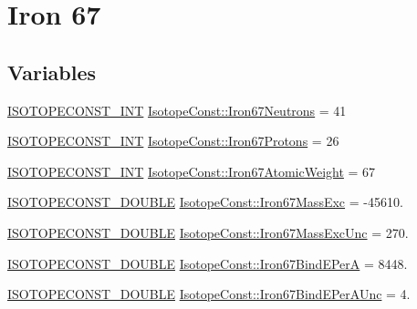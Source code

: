 \hypertarget{group___isotope_const-_iron-_fe67}{}\section{Iron 67}
\label{group___isotope_const-_iron-_fe67}
\subsection*{Variables}
\begin{DoxyCompactItemize}
\item 
\mbox{\hyperlink{group___isotope_const-_macros_ga5f18360b3e99483a35c32d789e62621c}{I\+S\+O\+T\+O\+P\+E\+C\+O\+N\+S\+T\+\_\+\+I\+NT}} \mbox{\hyperlink{group___isotope_const-_iron-_fe67_ga4c54272213845cc0ddd581d516defbfa}{Isotope\+Const\+::\+Iron67\+Neutrons}} = 41
\item 
\mbox{\hyperlink{group___isotope_const-_macros_ga5f18360b3e99483a35c32d789e62621c}{I\+S\+O\+T\+O\+P\+E\+C\+O\+N\+S\+T\+\_\+\+I\+NT}} \mbox{\hyperlink{group___isotope_const-_iron-_fe67_gaa5210e3b7420a4ed967f057b2b70e247}{Isotope\+Const\+::\+Iron67\+Protons}} = 26
\item 
\mbox{\hyperlink{group___isotope_const-_macros_ga5f18360b3e99483a35c32d789e62621c}{I\+S\+O\+T\+O\+P\+E\+C\+O\+N\+S\+T\+\_\+\+I\+NT}} \mbox{\hyperlink{group___isotope_const-_iron-_fe67_ga9f5e283e902f31cb39ec4d963811831b}{Isotope\+Const\+::\+Iron67\+Atomic\+Weight}} = 67
\item 
\mbox{\hyperlink{group___isotope_const-_macros_ga8f45a7272ce02c0b4c65c44636ed719a}{I\+S\+O\+T\+O\+P\+E\+C\+O\+N\+S\+T\+\_\+\+D\+O\+U\+B\+LE}} \mbox{\hyperlink{group___isotope_const-_iron-_fe67_ga3c478fc3050d270956f394af8ac315f3}{Isotope\+Const\+::\+Iron67\+Mass\+Exc}} = -\/45610.
\item 
\mbox{\hyperlink{group___isotope_const-_macros_ga8f45a7272ce02c0b4c65c44636ed719a}{I\+S\+O\+T\+O\+P\+E\+C\+O\+N\+S\+T\+\_\+\+D\+O\+U\+B\+LE}} \mbox{\hyperlink{group___isotope_const-_iron-_fe67_gaa00466830f0d4c23033dff5176c28757}{Isotope\+Const\+::\+Iron67\+Mass\+Exc\+Unc}} = 270.
\item 
\mbox{\hyperlink{group___isotope_const-_macros_ga8f45a7272ce02c0b4c65c44636ed719a}{I\+S\+O\+T\+O\+P\+E\+C\+O\+N\+S\+T\+\_\+\+D\+O\+U\+B\+LE}} \mbox{\hyperlink{group___isotope_const-_iron-_fe67_gac4a3b41edec666ba0edec29f855a9517}{Isotope\+Const\+::\+Iron67\+Bind\+E\+PerA}} = 8448.
\item 
\mbox{\hyperlink{group___isotope_const-_macros_ga8f45a7272ce02c0b4c65c44636ed719a}{I\+S\+O\+T\+O\+P\+E\+C\+O\+N\+S\+T\+\_\+\+D\+O\+U\+B\+LE}} \mbox{\hyperlink{group___isotope_const-_iron-_fe67_ga9f936bb7bd275f34133c4a6fb771ad4a}{Isotope\+Const\+::\+Iron67\+Bind\+E\+Per\+A\+Unc}} = 4.

\end{DoxyCompactItemize}
